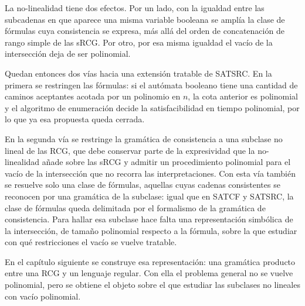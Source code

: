 La no-linealidad tiene dos efectos. Por un lado, con la igualdad
entre las subcadenas en que aparece una misma variable booleana se amplía la
clase de fórmulas cuya consistencia se expresa, más allá del orden de
concatenación de rango simple de las sRCG. Por otro, por esa misma
igualdad el vacío de la intersección deja de ser polinomial.

Quedan entonces dos vías hacia una extensión tratable de SATSRC. En
la primera se restringen las fórmulas: si el autómata booleano tiene
una cantidad de caminos aceptantes acotada por un polinomio en $n$,
la cota anterior es polinomial y el algoritmo de enumeración
decide la satisfacibilidad en tiempo polinomial, por lo que ya esa
propuesta queda cerrada.

En la segunda vía se restringe la gramática de consistencia a una
subclase no lineal de las RCG, que debe conservar parte de la
expresividad que la no-linealidad añade sobre las sRCG y admitir un
procedimiento polinomial para el vacío de la intersección que no
recorra las interpretaciones. Con esta vía también se resuelve solo
una clase de fórmulas, aquellas cuyas cadenas consistentes se
reconocen por una gramática de la subclase: igual que en SATCF y
SATSRC, la clase de fórmulas queda delimitada por el formalismo de la
gramática de consistencia. Para hallar esa subclase hace falta una
representación simbólica de la intersección, de tamaño polinomial
respecto a la fórmula, sobre la que estudiar con qué restricciones el
vacío se vuelve tratable.

En el capítulo siguiente se construye esa representación: una gramática
producto entre una RCG y un lenguaje regular. Con ella el problema
general no se vuelve polinomial, pero se obtiene el objeto sobre el que
estudiar las subclases no lineales con vacío polinomial.

